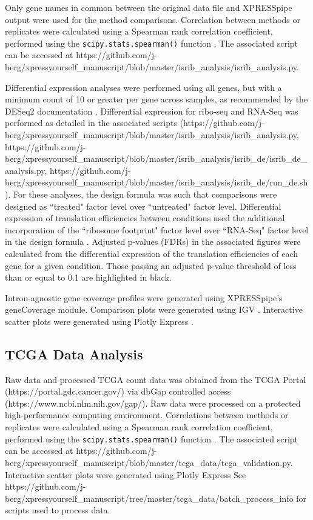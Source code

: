 \documentclass[10pt, oneside]{article}
\begin{document}
Only gene names in common between the original data file and XPRESSpipe output were used for the method comparisons. Correlation between methods or replicates were calculated using a Spearman rank correlation coefficient, performed using the \texttt{scipy.stats.spearman()} function \cite{spearman_rnaseq}. The associated script can be accessed at https://github.com/j-berg/xpressyourself\_manuscript/blob/master/isrib\_analysis/isrib\_analysis.py. \par

Differential expression analyses were performed using all genes, but with a minimum count of 10 or greater per gene across samples, as recommended by the DESeq2 documentation \cite{deseq2}. Differential expression for ribo-seq and RNA-Seq was performed as detailed in the associated scripts (https://github.com/j-berg/xpressyourself\_manuscript/blob/master/isrib\_analysis/isrib\_analysis.py, https://github.com/j-berg/xpressyourself\_manuscript/blob/master/isrib\_analysis/isrib\_de/isrib\_de\_analysis.py, https://github.com/j-berg/xpressyourself\_manuscript/blob/master/isrib\_analysis/isrib\_de/run\_de.sh). For these analyses, the design formula was such that comparisons were designed as ``treated" factor level over ``untreated" factor level. Differential expression of translation efficiencies between conditions used the additional incorporation of the ``ribosome footprint" factor level over ``RNA-Seq" factor level in the design formula \cite{deseq2,isrib_riboseq,ingolia_meth}. Adjusted p-values (FDRs) in the associated figures were calculated from the differential expression of the translation efficiencies of each gene for a given condition. Those passing an adjusted p-value threshold of less than or equal to 0.1 are highlighted in black. \par

Intron-agnostic gene coverage profiles were generated using XPRESSpipe's geneCoverage module. Comparison plots were generated using IGV \cite{igv}. Interactive scatter plots were generated using Plotly Express \cite{plotly}. \par

\subsection{TCGA Data Analysis}
Raw data and processed TCGA count data was obtained from the TCGA Portal (https://portal.gdc.cancer.gov/) via dbGap controlled access (https://www.ncbi.nlm.nih.gov/gap/). Raw data were processed on a protected high-performance computing environment. Correlations between methods or replicates were calculated using a Spearman rank correlation coefficient, performed using the \texttt{scipy.stats.spearman()} function \cite{spearman_rnaseq}. The associated script can be accessed at https://github.com/j-berg/xpressyourself\_manuscript/blob/master/tcga\_data/tcga\_validation.py. Interactive scatter plots were generated using Plotly Express \cite{plotly} See https://github.com/j-berg/xpressyourself\_manuscript/tree/master/tcga\_data/batch\_process\_info for scripts used to process data. \par
\end{document}
